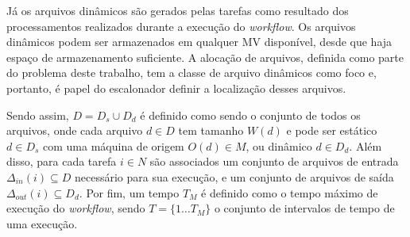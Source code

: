Já os arquivos dinâmicos são gerados pelas tarefas como resultado dos processamentos realizados durante a execução do \textit{workflow}. Os arquivos dinâmicos podem ser armazenados em qualquer MV disponível, desde que haja espaço de armazenamento suficiente. A alocação de arquivos, definida como parte do problema deste trabalho, tem a classe de arquivo dinâmicos como foco e, portanto, é papel do escalonador definir a localização desses arquivos.

Sendo assim, $D = D_s \cup D_d$ é definido como sendo o conjunto de todos os arquivos, onde cada arquivo $d \in D$ tem tamanho $W(d)$ e pode ser estático $d \in D_s$ com uma máquina de origem $O(d) \in M$, ou dinâmico $d \in D_d$. Além disso, para cada tarefa $i \in N$ são associados um conjunto de arquivos de entrada $\Delta_{in}(i) \subseteq D$ necessário para sua execução, e um conjunto de arquivos de saída $\Delta_{out}(i) \subseteq D_d$.  Por fim, um tempo $T_M$ é definido como o tempo máximo de execução do \textit{workflow}, sendo $T=\{1 \ldots T_M\}$ o conjunto de intervalos de tempo de uma execução. 


 
    
    
